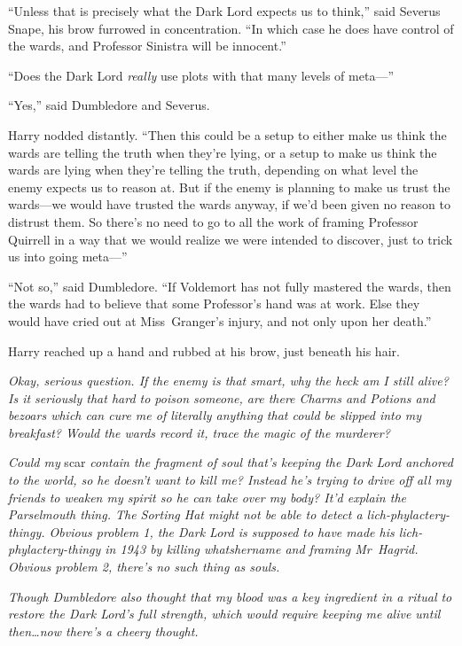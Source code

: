 “Unless that is precisely what the Dark Lord expects us to think,” said Severus Snape, his brow furrowed in concentration. “In which case he does have control of the wards, and Professor Sinistra will be innocent.”

“Does the Dark Lord \emph{really} use plots with that many levels of meta—”

“Yes,” said Dumbledore and Severus.

Harry nodded distantly. “Then this could be a setup to either make us think the wards are telling the truth when they’re lying, or a setup to make us think the wards are lying when they’re telling the truth, depending on what level the enemy expects us to reason at. But if the enemy is planning to make us trust the wards—we would have trusted the wards anyway, if we’d been given no reason to distrust them. So there’s no need to go to all the work of framing Professor Quirrell in a way that we would realize we were intended to discover, just to trick us into going meta—”

“Not so,” said Dumbledore. “If Voldemort has not fully mastered the wards, then the wards had to believe that some Professor’s hand was at work. Else they would have cried out at Miss~Granger’s injury, and not only upon her death.”

Harry reached up a hand and rubbed at his brow, just beneath his hair.

\emph{Okay, serious question. If the enemy is that smart, why the heck am I still alive? Is it seriously that hard to poison someone, are there Charms and Potions and bezoars which can cure me of literally anything that could be slipped into my breakfast? Would the wards record it, trace the magic of the murderer?}

\emph{Could my} scar \emph{contain the fragment of soul that’s keeping the Dark Lord anchored to the world, so he doesn’t want to kill me? Instead he’s trying to drive off all my friends to weaken my spirit so he can take over my body? It’d explain the Parselmouth thing. The Sorting Hat might not be able to detect a lich-phylactery-thingy. Obvious problem 1, the Dark Lord is supposed to have made his lich-phylactery-thingy in 1943 by killing whatshername and framing Mr~Hagrid. Obvious problem 2, there’s no such thing as souls.}

\emph{Though Dumbledore also thought that my blood was a key ingredient in a ritual to restore the Dark Lord’s full strength, which would require keeping me alive until then…now there’s a cheery thought.}

